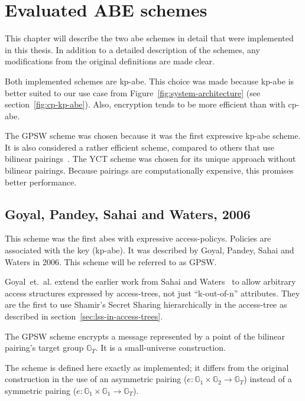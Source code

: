 \chapter{Evaluated ABE schemes}\label{chapter:constructions} 

This chapter will describe the two \acrshort{abe} schemes in detail that were implemented in this thesis.
In addition to a detailed description of the schemes, any modifications from the original definitions are made clear.

Both implemented schemes are \acrshort{kp-abe}.
This choice was made because \acrshort{kp-abe} is better suited to our use case from Figure~\ref{fig:system-architecture} (see section~\ref{fig:cp-kp-abe}).
Also, encryption tends to be more efficient than with \acrshort{cp-abe}.

The GPSW scheme was chosen because it was the first expressive \acrshort{kp-abe} scheme. It is also considered a rather efficient scheme, compared to others that use bilinear pairings~\cite{girgenti_feasibility_2019}.
The YCT scheme was chosen for its unique approach without bilinear pairings. Because pairings are computationally expensive, this promises better performance.

\section{Goyal, Pandey, Sahai and Waters, 2006}
This scheme was the first \acrshort{abes} with expressive \glspl{access-policy}. Policies are associated with the key (\acrshort{kp-abe}).
It was described by Goyal, Pandey, Sahai and Waters \cite{goyal_attribute-based_2006} in 2006. This scheme will be referred to as GPSW.

Goyal~et.~al. extend the earlier work from Sahai and Waters~\cite{sahai_fuzzy_2005} to allow arbitrary access structures expressed by \glspl{access-tree}, not just ``k-out-of-n'' attributes.
They are the first to use Shamir's Secret Sharing hierarchically in the \gls{access-tree} as described in section~\ref{sec:lss-in-access-trees}. 

The GPSW scheme encrypts a message represented by a point of the bilinear pairing's target group $\mathbb{G}_T$.
It is a \gls{small-universe} construction.

The scheme is defined here exactly as implemented; it differs from the original construction in the use of an asymmetric pairing ($e: \mathbb{G}_1 \times \mathbb{G}_2 \rightarrow \mathbb{G}_T$) instead of a symmetric pairing ($e: \mathbb{G}_1 \times \mathbb{G}_1 \rightarrow \mathbb{G}_T$).

